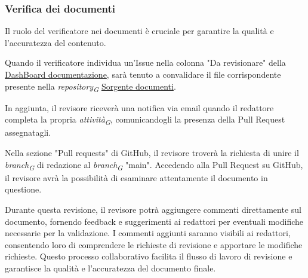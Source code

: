 \subsubsection{Verifica dei documenti}
\label{sec:verificatori}

Il ruolo del verificatore nei documenti è cruciale per garantire la qualità e l'accuratezza del contenuto. 

Quando il verificatore individua un'Issue nella colonna "Da revisionare" della \href{https://github.com/orgs/ByteOps-swe/projects/1/views/1}{DashBoard documentazione}, sarà tenuto a convalidare il file corrispondente presente nella \textit{repository}\textsubscript{\textit{G}} \href{https://github.com/ByteOps-swe/Sorgente-documenti}{Sorgente documenti}.

In aggiunta, il revisore riceverà una notifica via email quando il redattore completa la propria \textit{attività}\textsubscript{\textit{G}}, comunicandogli la presenza della Pull Request assegnatagli.

Nella sezione "Pull requests" di GitHub, il revisore troverà la richiesta di unire il \textit{branch}\textsubscript{\textit{G}} di redazione al \textit{branch}\textsubscript{\textit{G}} "main". Accedendo alla Pull Request su GitHub, il revisore avrà la possibilità di esaminare attentamente il documento in questione.

Durante questa revisione, il revisore potrà aggiungere commenti direttamente sul documento, fornendo feedback e suggerimenti ai redattori per eventuali modifiche necessarie per la validazione. I commenti aggiunti saranno visibili ai redattori, consentendo loro di comprendere le richieste di revisione e apportare le modifiche richieste. Questo processo collaborativo facilita il flusso di lavoro di revisione e garantisce la qualità e l'accuratezza del documento finale.

\vspace{0.3cm}

